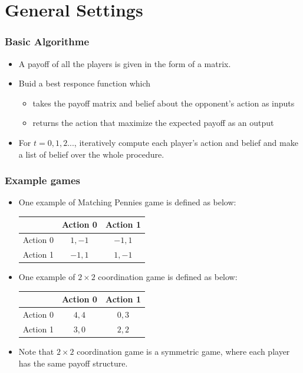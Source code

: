 \documentclass[dvipdfmx,fleqn]{beamer}
\begin{document}
\section{General Settings}

\begin{frame}
\frametitle{Basic Algorithme}
\begin{itemize}\setlength{\parskip}{0.5em}
\item
A payoff of all the players is given in the form of a matrix.

\item
Buid a best responce function which
 \begin{itemize}\setlength{\parskip}{0.5em}
 \item
 takes the payoff matrix and belief about the opponent's action as inputs

 \item
 returns the action that maximize the expected payoff as an output
 \end{itemize}
\item
For $t = 0, 1, 2...$, iteratively compute each player's action and belief and make a list of belief over the whole procedure.

\end{itemize}
\end{frame}

\begin{frame}
\frametitle{Example games}
\begin{itemize}\setlength{\parskip}{0.5em}
\item
One example of Matching Pennies game is defined as below:

 \begin{table}
 \begin{tabular}{|c|c|c|} \hline
    　 & Action 0 & Action 1 \\ \hline 
    Action 0 & $1,-1$ & $-1,1$ \\ \hline
    Action 1 & $-1,1$ & $1,-1$ \\ \hline
   \end{tabular}
  \end{table}

\item
One example of $2\times2$ coordination game is defined as below:

 \begin{table}
 \begin{tabular}{|c|c|c|} \hline
    　 & Action 0 & Action 1 \\ \hline 
    Action 0 & $4, 4$ & $0, 3$ \\ \hline
    Action 1 & $3, 0$ & $2, 2$ \\ \hline
   \end{tabular}
  \end{table}

\item
Note that $2\times2$ coordination game is a symmetric game, where each player has the same payoff structure.

\end{itemize}
\end{frame}
\end{document}
